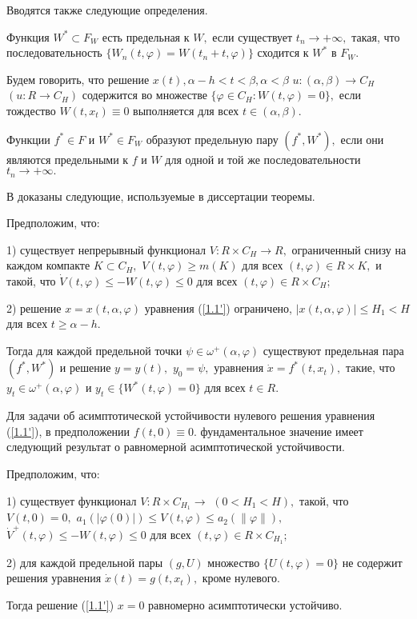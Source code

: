 Вводятся также следующие определения.

Функция $W^*\subset F_W$ есть предельная к $W,$  если
	существует $t_n\to +\infty, $  такая,  что  последовательность $\{
	W_n(t,\varphi )=W(t_n+t,\varphi )\}$ сходится к $W^*$  в $F_{W}.$

Будем говорить, что решение $x(t), \alpha - h < t < \beta, \alpha < \beta$
	$u : (\alpha ,\beta )\to C_{H}$ $(u : R\to C_{H})$ содержится во
	множестве $\{ \varphi\in C_{H} : W(t,\varphi )=0 \},$ если
	тождество $W(t, x_t)\equiv 0$ выполняется для всех $t\in (\alpha
	,\beta )$.

Функции $f^* \in F$ и $W^*\in F_W$ образуют
	предельную пару $(f^*,W^*),$ если они являются предельными  к $f$ и
	$W$ для  одной  и  той  же  последовательности $t_n\to +\infty .$

В \cite{andr10} доказаны следующие, используемые в диссертации теоремы.

\begin{theorem}\label{t-1.3} Предположим, что:
	
	1) 
	существует непрерывный функционал $V : R \times C_H\to R,$  ограниченный
	снизу на каждом компакте $K\subset C_H,$ $V(t,\varphi )\ge m(K)$
	для всех $(t,\varphi )\in R \times K,$ и такой, что $\dot
	V(t,\varphi )\le -W(t,\varphi )\le 0$  для  всех $(t,\varphi )\in R
	\times C_H;$
	
	2) решение $x=x(t,\alpha ,\varphi )$ уравнения (\ref{1.1'})  ограничено,
	$|x(t,\alpha ,\varphi )|\le H_1<H$
	для всех $t\ge\alpha -h.$
	
	Тогда для каждой  предельной
	точки $\psi\in\omega ^+(\alpha ,\varphi )$  существуют  предельная
	пара  $(f^*, W^*)$ и решение $y=y(t),$ $y_0=\psi, $ уравнения $\dot x=f^*(t,x_t),$  такие,  что
	$ y_t\in \omega ^+(\alpha ,\varphi )$ и
	$y_t \in \{ W^*(t,\varphi )=0 \}$
		для всех  $t\in R.$
\end{theorem}
	
Для задачи об асимптотической устойчивости нулевого решения уравнения (\ref{1.1'}), в предположении $f(t,0)\equiv 0.$ фундаментальное значение имеет следующий  результат о равномерной асимптотической устойчивости.
	
	\begin{theorem}\label{t-4.5} Предположим, что:
		
		1) существует функционал $V: R \times C_{H_1}\to $ $(0<H_1<H),$
		такой,  что $V(t,0)=0,$ $a_1(|\varphi (0)|)\le V(t,\varphi )\le a_2(\|\varphi \| ),$
		$\dot V^+(t,\varphi )\le -W(t,\varphi )\le 0$ для всех
		$(t,\varphi )\in R \times C_{H_1};$
		
		2) для  каждой  предельной пары $(g,U)$  множество $\{ U(t,\varphi )=0\}$  не
		содержит решения уравнения $\dot x(t)=g(t,x_t),$  кроме нулевого.
		
		
		Тогда решение (\ref{1.1'})  $x=0$ равномерно асимптотически устойчиво.
	\end{theorem}
	
